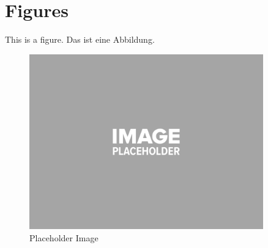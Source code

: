 \chapter{Figures}
\label{ch:figures}

This is a figure. Das ist eine Abbildung.

\begin{figure}[H]
\centering
\includegraphics[width=0.9\textwidth]{_img/placeholder_image.png}
\caption[Placeholder Image]{Placeholder Image}
\label{fig:placeholder_image}
\end{figure}